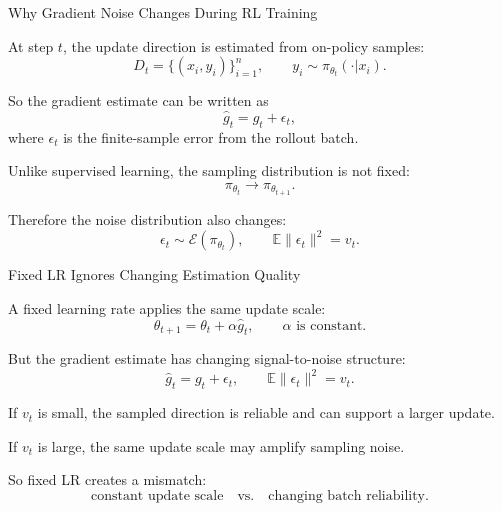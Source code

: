 \documentclass[aspectratio=169]{beamer}
\begin{document}
\begin{frame}{Why Gradient Noise Changes During RL Training}
\small

At step \(t\), the update direction is estimated from on-policy samples:
\[
  D_t=\{(x_i,y_i)\}_{i=1}^n,
  \qquad
  y_i\sim\pi_{\theta_t}(\cdot|x_i).
\]

So the gradient estimate can be written as
\[
  \hat g_t = g_t+\epsilon_t,
\]
where \(\epsilon_t\) is the finite-sample error from the rollout batch.

\vspace{0.8em}

Unlike supervised learning, the sampling distribution is not fixed:
\[
  \pi_{\theta_t}
  \longrightarrow
  \pi_{\theta_{t+1}}.
\]

\vspace{0.8em}

Therefore the noise distribution also changes:
\[
  \epsilon_t \sim \mathcal E(\pi_{\theta_t}),
  \qquad
  \mathbb E\|\epsilon_t\|^2 = v_t .
\]



\end{frame}


\begin{frame}{Fixed LR Ignores Changing Estimation Quality}
\small

A fixed learning rate applies the same update scale:
\[
  \theta_{t+1}
  =
  \theta_t+\alpha\hat g_t,
  \qquad
  \alpha \text{ is constant.}
\]

\vspace{0.8em}

But the gradient estimate has changing signal-to-noise structure:
\[
  \hat g_t=g_t+\epsilon_t,
  \qquad
  \mathbb E\|\epsilon_t\|^2=v_t .
\]

\vspace{0.8em}

If \(v_t\) is small, the sampled direction is reliable and can support a larger update.

If \(v_t\) is large, the same update scale may amplify sampling noise.

\vspace{0.8em}

So fixed LR creates a mismatch:
\[
  \text{constant update scale}
  \quad\text{vs.}\quad
  \text{changing batch reliability}.
\]

\end{frame}
\end{document}

